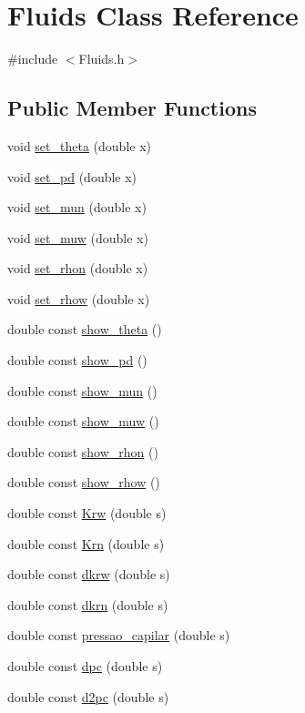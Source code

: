 \hypertarget{classFluids}{}\section{Fluids Class Reference}
\label{classFluids}


{\ttfamily \#include $<$Fluids.\+h$>$}

\subsection*{Public Member Functions}
\begin{DoxyCompactItemize}
\item 
void \hyperlink{classFluids_a7aa55e7d25e0bec0ffa926a9fdb19b22}{set\+\_\+theta} (double x)
\item 
void \hyperlink{classFluids_ac0bfd221bb7f40b21eeb4c20f4e68017}{set\+\_\+pd} (double x)
\item 
void \hyperlink{classFluids_a135ba7011914007d5cc82528d08595c4}{set\+\_\+mun} (double x)
\item 
void \hyperlink{classFluids_a55bdef7f5229ab62d2616d4617d5898c}{set\+\_\+muw} (double x)
\item 
void \hyperlink{classFluids_a5284e84fd9cc680c0cb17ccf72cdc722}{set\+\_\+rhon} (double x)
\item 
void \hyperlink{classFluids_a5e905062ca17feb08fa1afc89efe042d}{set\+\_\+rhow} (double x)
\item 
double const \hyperlink{classFluids_ad61d110a5ed2e811965c2f6c623fc249}{show\+\_\+theta} ()
\item 
double const \hyperlink{classFluids_ad1fe62c857d216c5e87501c772a680e5}{show\+\_\+pd} ()
\item 
double const \hyperlink{classFluids_a426336b6a2fe1d6eb97b2af958d0b5e6}{show\+\_\+mun} ()
\item 
double const \hyperlink{classFluids_ad465f29caf6e368ebaa7662156482c9b}{show\+\_\+muw} ()
\item 
double const \hyperlink{classFluids_a1cd1ff51be0e735425bb00e470ed3cbc}{show\+\_\+rhon} ()
\item 
double const \hyperlink{classFluids_abc729002dd8045a86a24727d1fa69a12}{show\+\_\+rhow} ()
\item 
double const \hyperlink{classFluids_abaa29b5611ffefe8f2171692ffd62d38}{Krw} (double s)
\item 
double const \hyperlink{classFluids_a01d25f71f5c00a566032c19bd63a473f}{Krn} (double s)
\item 
double const \hyperlink{classFluids_abd769e3a9081140ed4fc7d877c6672d4}{dkrw} (double s)
\item 
double const \hyperlink{classFluids_a66c100be378f015b8bbe47a0e0c176c1}{dkrn} (double s)
\item 
double const \hyperlink{classFluids_a26c1a1fba1aa34becddfbc4fb07692dd}{pressao\+\_\+capilar} (double s)
\item 
double const \hyperlink{classFluids_aa332e363bb05e9c5559386000241d66f}{dpc} (double s)
\item 
double const \hyperlink{classFluids_a860c3c2af6dae8c158a78770dfc76ce8}{d2pc} (double s)
\end{DoxyCompactItemize}
